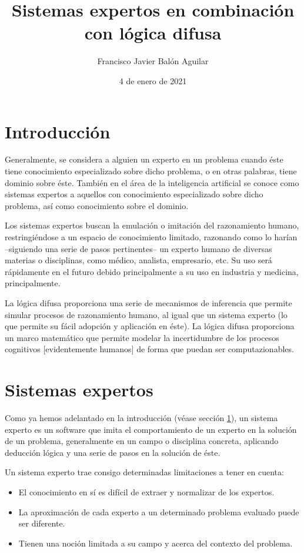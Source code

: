 \documentclass[a4paper, 11pt, titlepage]{article}
\title{Sistemas expertos en combinación con lógica difusa}
\author{Francisco Javier Balón Aguilar}
\date{4 de enero de 2021}
\begin{document}
\maketitle
\renewcommand{\contentsname}{Índice}
\tableofcontents
\newpage

\section{Introducción}\label{introduccion}

    Generalmente, se considera a alguien un experto en un problema cuando éste tiene
    conocimiento especializado sobre dicho problema, o en otras palabras, tiene dominio 
    sobre éste.  También en el área de la inteligencia artificial se conoce como 
    sistemas expertos a aquellos con conocimiento especializado sobre dicho problema, así 
    como conocimiento sobre el dominio.

    Los sistemas expertos buscan la emulación o imitación del razonamiento humano, 
    restringiéndose a un espacio de conocimiento limitado, razonando como lo harían
    --siguiendo una serie de pasos pertinentes-- un experto humano de diversas materias 
    o disciplinas, como médico, analista, empresario, etc. Su uso será rápidamente en el 
    futuro debido principalmente a su uso en industria y medicina, principalmente.

    La lógica difusa proporciona una serie de mecanismos de inferencia que permite simular 
    procesos de razonamiento humano, al igual que un sistema experto (lo que permite su 
    fácil adopción y aplicación en éste). La lógica difusa proporciona un marco matemático 
    que permite modelar la incertidumbre de los procesos cognitivos [evidentemente humanos]
    de forma que puedan ser computazionables.

\section{Sistemas expertos}

    Como ya hemos adelantado en la introducción (véase sección \ref{introduccion}), un sistema 
    experto es un software que imita el comportamiento de un experto en la solución de un problema, 
    generalmente en un campo o disciplina concreta, aplicando deducción lógica y una serie de 
    pasos en la solución de éste.

    Un sistema experto trae consigo determinadas limitaciones a tener en cuenta:
    
    \begin{itemize}
        \item El conocimiento en sí es difícil de extraer y normalizar de los expertos.
        \item La aproximación de cada experto a un determinado problema evaluado puede ser diferente.
        \item Tienen una noción limitada a su campo y acerca del contexto del problema.
    \end{itemize}
\end{document}
